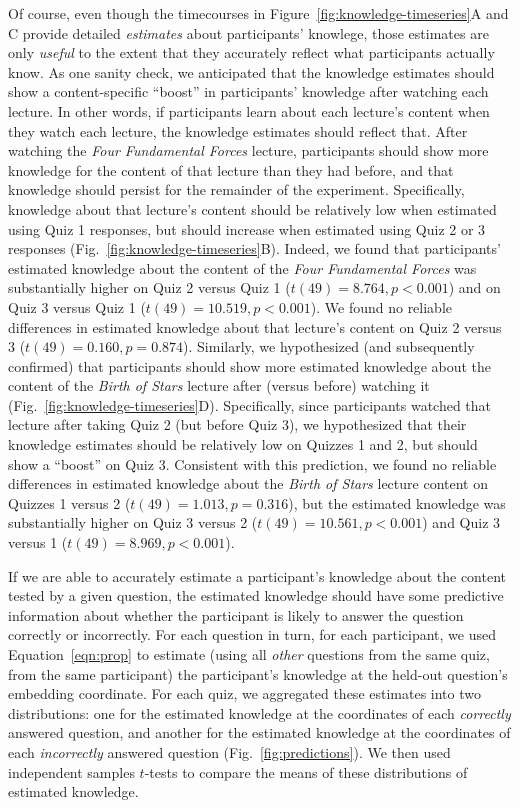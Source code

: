 \documentclass[10pt]{article}
\begin{document}
Of course, even though the timecourses in
Figure~\ref{fig:knowledge-timeseries}A and C provide detailed
\textit{estimates} about participants' knowlege, those estimates are only
\textit{useful} to the extent that they accurately reflect what participants
actually know. As one sanity check, we anticipated that the knowledge estimates
should show a content-specific ``boost'' in participants' knowledge after
watching each lecture. In other words, if participants learn about each
lecture's content when they watch each lecture, the knowledge estimates should
reflect that. After watching the \textit{Four Fundamental Forces} lecture,
participants should show more knowledge for the content of that lecture than
they had before, and that knowledge should persist for the remainder of the
experiment. Specifically, knowledge about that lecture's content should be
relatively low when estimated using Quiz 1 responses, but should increase when
estimated using Quiz 2 or 3 responses (Fig.~\ref{fig:knowledge-timeseries}B).
Indeed, we found that participants' estimated knowledge about the content of
the \textit{Four Fundamental Forces} was substantially higher on Quiz 2 versus
Quiz 1 ($t(49) = 8.764, p < 0.001$) and on Quiz 3 versus Quiz 1 ($t(49) = 10.519, p <
0.001$). We found no reliable differences in estimated knowledge about that
lecture's content on Quiz 2 versus 3 ($t(49) = 0.160, p = 0.874$). Similarly, we
hypothesized (and subsequently confirmed) that participants should show more
estimated knowledge about the content of the \textit{Birth of Stars} lecture
after (versus before) watching it (Fig.~\ref{fig:knowledge-timeseries}D).
Specifically, since participants watched that lecture after taking Quiz 2 (but
before Quiz 3), we hypothesized that their knowledge estimates should be
relatively low on Quizzes 1 and 2, but should show a ``boost'' on Quiz 3.
Consistent with this prediction, we found no reliable differences in estimated
knowledge about the \textit{Birth of Stars} lecture content on Quizzes 1 versus
2 ($t(49) = 1.013, p = 0.316$), but the estimated knowledge was substantially higher
on Quiz 3 versus 2 ($t(49) = 10.561, p < 0.001$) and Quiz 3 versus 1 ($t(49) = 8.969, p <
0.001$).

If we are able to accurately estimate a participant's knowledge about the
content tested by a given question, the estimated knowledge should have some
predictive information about whether the participant is likely to answer the
question correctly or incorrectly. For each question in turn, for each
participant, we used Equation~\ref{eqn:prop} to estimate (using all
\textit{other} questions from the same quiz, from the same participant) the
participant's knowledge at the held-out question's embedding coordinate. For
each quiz, we aggregated these estimates into two distributions: one for the
estimated knowledge at the coordinates of each \textit{correctly} answered
question, and another for the estimated knowledge at the coordinates of each
\textit{incorrectly} answered question (Fig.~\ref{fig:predictions}). We then
used independent samples $t$-tests to compare the means of these distributions
of estimated knowledge.
\end{document}
